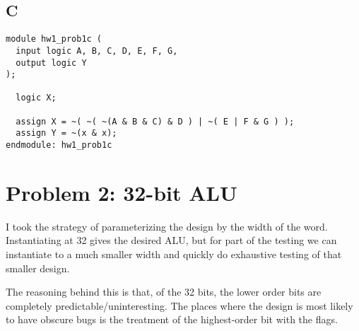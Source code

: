 \documentclass{article}
\begin{document}
\subsection{C}

\begin{Verbatim}[frame=single]
module hw1_prob1c (
  input logic A, B, C, D, E, F, G,
  output logic Y
);

  logic X;

  assign X = ~( ~( ~(A & B & C) & D ) | ~( E | F & G ) );
  assign Y = ~(x & x);
endmodule: hw1_prob1c
\end{Verbatim}
\section{Problem 2: 32-bit ALU}

I took the strategy of parameterizing the design by the width of the word.
Instantiating at 32 gives the desired ALU, but for part of the testing
we can instantiate to a much smaller width and quickly do exhaustive testing
of that smaller design.

The reasoning behind this is that, of the 32 bits, the lower order
bits are completely predictable/uninteresting.  The places where the
design is most likely to have obscure bugs is the treatment of the
highest-order bit with the flags.
\end{document}
